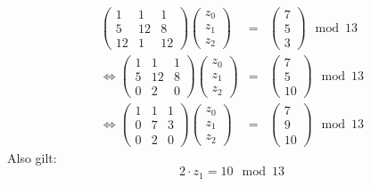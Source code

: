 \documentclass[DIN, pagenumber=false, fontsize=11pt, parskip=half]{scrartcl}
\begin{document}
    \begin{eqnarray}
        \begin{pmatrix}
            1 & 1 & 1 \\
            5 & 12 & 8 \\
            12 & 1 & 12
        \end{pmatrix}
        \begin{pmatrix}
            z_0 \\ z_1 \\ z_2
        \end{pmatrix}
        &=&
        \begin{pmatrix}
            7 \\ 5 \\ 3
        \end{pmatrix} \mod 13 \\
        \Leftrightarrow
        \begin{pmatrix}
            1 & 1 & 1 \\
            5 & 12 & 8 \\
            0 & 2 & 0
        \end{pmatrix}
        \begin{pmatrix}
            z_0 \\ z_1 \\ z_2
        \end{pmatrix}
        &=&
        \begin{pmatrix}
            7 \\ 5 \\ 10
        \end{pmatrix} \mod 13 \\
        \Leftrightarrow
        \begin{pmatrix}
            1 & 1 & 1 \\
            0 & 7 & 3 \\
            0 & 2 & 0
        \end{pmatrix}
        \begin{pmatrix}
            z_0 \\ z_1 \\ z_2
        \end{pmatrix}
        &=&
        \begin{pmatrix}
            7 \\ 9 \\ 10
        \end{pmatrix} \mod 13
    \end{eqnarray}
    Also gilt:
    \begin{equation}
        2 \cdot z_1 = 10 \mod 13
    \end{equation}
\end{document}

